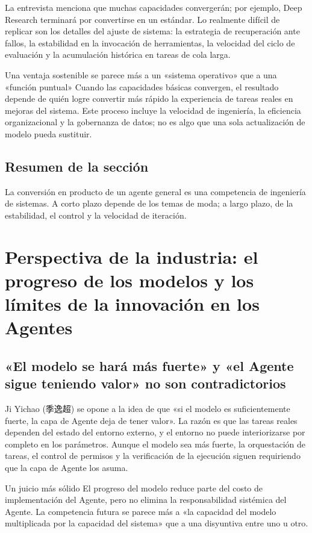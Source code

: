 \documentclass[a4paper]{article}
\begin{document}
La entrevista menciona que muchas capacidades convergerán; por ejemplo, Deep Research terminará por convertirse en un estándar. Lo realmente difícil de replicar son los detalles del ajuste de sistema: la estrategia de recuperación ante fallos, la estabilidad en la invocación de herramientas, la velocidad del ciclo de evaluación y la acumulación histórica en tareas de cola larga.

\begin{knowledgebox}{Una ventaja sostenible se parece más a un «sistema operativo» que a una «función puntual»}
Cuando las capacidades básicas convergen, el resultado depende de quién logre convertir más rápido la experiencia de tareas reales en mejoras del sistema. Este proceso incluye la velocidad de ingeniería, la eficiencia organizacional y la gobernanza de datos; no es algo que una sola actualización de modelo pueda sustituir.
\end{knowledgebox}

\subsection{Resumen de la sección}

La conversión en producto de un agente general es una competencia de ingeniería de sistemas. A corto plazo depende de los temas de moda; a largo plazo, de la estabilidad, el control y la velocidad de iteración.

\section{Perspectiva de la industria: el progreso de los modelos y los límites de la innovación en los Agentes}

\subsection{«El modelo se hará más fuerte» y «el Agente sigue teniendo valor» no son contradictorios}

Ji Yichao (季逸超) se opone a la idea de que «si el modelo es suficientemente fuerte, la capa de Agente deja de tener valor». La razón es que las tareas reales dependen del estado del entorno externo, y el entorno no puede interiorizarse por completo en los parámetros. Aunque el modelo sea más fuerte, la orquestación de tareas, el control de permisos y la verificación de la ejecución siguen requiriendo que la capa de Agente los asuma.

\begin{importantbox}{Un juicio más sólido}
El progreso del modelo reduce parte del costo de implementación del Agente, pero no elimina la responsabilidad sistémica del Agente. La competencia futura se parece más a «la capacidad del modelo multiplicada por la capacidad del sistema» que a una disyuntiva entre uno u otro.
\end{importantbox}
\end{document}
